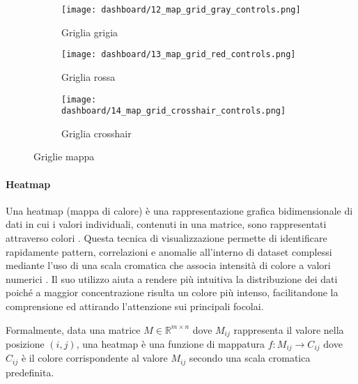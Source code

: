 \begin{figure}[H]
  \centering

  \begin{subfigure}{0.48\textwidth}
    \centering
    \texttt{[image: dashboard/12\_map\_grid\_gray\_controls.png]}
    \caption{Griglia grigia}
    \label{fig:map-grid-gray}
  \end{subfigure}
  \hfill
  \begin{subfigure}{0.48\textwidth}
    \centering
    \texttt{[image: dashboard/13\_map\_grid\_red\_controls.png]}
    \caption{Griglia rossa}
    \label{fig:map-grid-red}
  \end{subfigure}

  \vspace{1em}

  \begin{subfigure}{0.48\textwidth}
    \centering
    \texttt{[image: dashboard/14\_map\_grid\_crosshair\_controls.png]}
    \caption{Griglia crosshair}
    \label{fig:map-grid-crosshair}
  \end{subfigure}

  \caption{Griglie mappa}
  \label{fig:app-map-grids}
\end{figure}

\newpage

\paragraph{Heatmap}

Una heatmap (mappa di calore) è una rappresentazione grafica bidimensionale di dati in cui i valori individuali,
contenuti in una matrice, sono rappresentati attraverso colori \citep{wilkinson2009grammar}.
Questa tecnica di visualizzazione permette di identificare rapidamente pattern, correlazioni e anomalie
all'interno di dataset complessi mediante l'uso di una scala cromatica che associa intensità di colore
a valori numerici \citep{cleveland1993visualizing}. Il suo utilizzo aiuta a rendere più intuitiva la distribuzione
dei dati poiché a maggior concentrazione risulta un colore più intenso, facilitandone la comprensione ed attirando
l'attenzione sui principali focolai.

Formalmente, data una matrice $M \in \mathbb{R}^{m \times n}$ dove $M_{ij}$ rappresenta il valore
nella posizione $(i,j)$, una heatmap è una funzione di mappatura $ f: M_{ij} \rightarrow C_{ij} $
dove $C_{ij}$ è il colore corrispondente al valore $M_{ij}$ secondo una scala cromatica predefinita.

